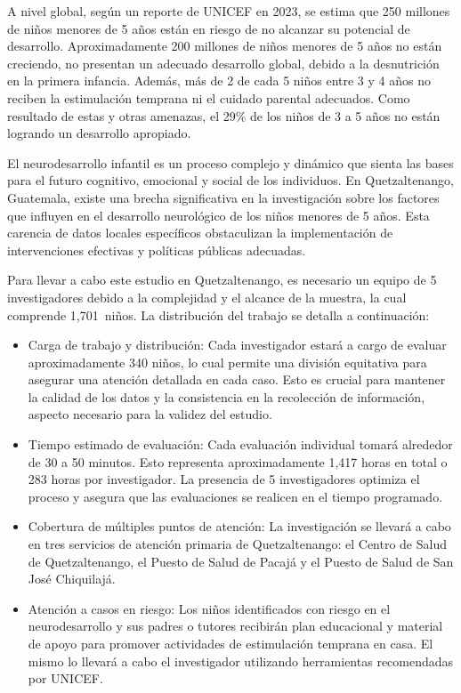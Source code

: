 \documentclass[11pt,letterpaper]{report}
\newcommand{\muestradeseada}{1,701}
\begin{document}
A nivel global, según un reporte de UNICEF en 2023, se estima que 250 millones
de niños menores de 5 años están en riesgo de no alcanzar su potencial de
desarrollo. Aproximadamente 200 millones de niños menores de 5 años no están
creciendo, no presentan un adecuado desarrollo global, debido a la desnutrición
en la primera infancia. Además, más de 2 de cada 5 niños entre 3 y 4 años no
reciben la estimulación temprana ni el cuidado parental adecuados. Como
resultado de estas y otras amenazas, el 29\% de los niños de 3 a 5 años no
están logrando un desarrollo apropiado. \cite{UNICEF2023}

El neurodesarrollo infantil es un proceso complejo y dinámico que sienta las
bases para el futuro cognitivo, emocional y social de los individuos. En
Quetzaltenango, Guatemala, existe una brecha significativa en la investigación
sobre los factores que influyen en el desarrollo neurológico de los niños
menores de 5 años. Esta carencia de datos locales específicos obstaculizan la
implementación de intervenciones efectivas y políticas públicas adecuadas.

Para llevar a cabo este estudio en Quetzaltenango, es necesario un equipo de 5
investigadores debido a la complejidad y el alcance de la muestra, la cual
comprende \muestradeseada\ niños. La distribución del trabajo se detalla a
continuación:

	\begin{itemize}
		\item Carga de trabajo y distribución: Cada investigador estará a cargo
		de evaluar aproximadamente 340 niños, lo cual permite una división
		equitativa para asegurar una atención detallada en cada caso. Esto es
		crucial para mantener la calidad de los datos y la consistencia en la
		recolección de información, aspecto necesario para la validez del
		estudio.
		\item Tiempo estimado de evaluación: Cada evaluación individual tomará
		alrededor de 30 a 50 minutos. Esto representa aproximadamente 1,417
		horas en total o 283 horas por investigador. La presencia de 5
		investigadores optimiza el proceso y asegura que las evaluaciones se
		realicen en el tiempo programado.
		\item Cobertura de múltiples puntos de atención: La investigación se
		llevará a cabo en tres servicios de atención primaria de
		Quetzaltenango: el Centro de Salud de Quetzaltenango, el Puesto de
		Salud de Pacajá y el Puesto de Salud de San José Chiquilajá.
		\item Atención a casos en riesgo: Los niños identificados con riesgo en
		el neurodesarrollo y sus padres o tutores recibirán plan educacional y
		material de apoyo para promover actividades de estimulación temprana en
		casa. El mismo lo llevará a cabo el investigador utilizando
		herramientas recomendadas por UNICEF.
	\end{itemize}
\end{document}

